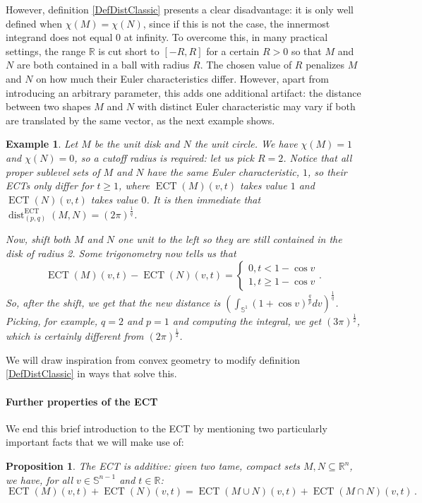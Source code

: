 \documentclass[a4paper]{article}
\newtheorem{prop}[theorem]{Proposition}
\newtheorem{example}[theorem]{Example}
\newcommand{\ECT}{\operatorname{ECT}}
\newcommand{\bb}{\mathbb}
\newcommand{\dist}[2]{\operatorname{dist}^{\operatorname{ECT}}_{(#1, #2)}}
\begin{document}
However, definition \ref{DefDistClassic} presents a clear disadvantage: it is only well defined when $\chi(M)=\chi(N)$, since if this is not the case, the innermost integrand does not equal $0$ at infinity. To overcome this, in many practical settings, the range $\mathbb R$ is cut short to $[-R,R]$ for a certain $R>0$ so that $M$ and $N$ are both contained in a ball with radius $R$. The chosen value of $R$ penalizes $M$ and $N$ on how much their Euler characteristics differ. However, apart from introducing an arbitrary parameter, this adds one additional artifact: the distance between two shapes $M$ and $N$ with distinct Euler characteristic may vary if both are translated by the same vector, as the next example shows.
\begin{example}
	Let $M$ be the unit disk and $N$ the unit circle. We have $\chi(M)=1$ and $\chi(N)=0$, so a cutoff radius is required: let us pick $R=2$. Notice that all proper sublevel sets of $M$ and $N$ have the same Euler characteristic, $1$, so their ECTs only differ for $t \geq 1$, where $\ECT(M)(v,t)$ takes value $1$ and $\ECT(N)(v,t)$ takes value $0$. It is then immediate that $\dist{p}{q}(M,N)=(2 \pi)^\frac{1}{q}$.
	
	Now, shift both $M$ and $N$ one unit to the left so they are still contained in the disk of radius 2. Some trigonometry now tells us that \[\ECT(M)(v,t)-\ECT(N)(v,t)=\begin{cases}
		0, t < 1-\cos v \\
		1, t \geq 1-\cos v
	\end{cases}.\] So, after the shift, we get that the new distance is $\left( \int_{\bb S^1} (1+\cos v)^\frac{q}{p} dv\right)^\frac{1}{q}$. Picking, for example, $q=2$ and $p=1$ and computing the integral, we get $(3\pi )^\frac{1}{2}$, which is certainly different from $(2\pi)^\frac{1}{2}$.
\end{example}
We will draw inspiration from convex geometry to modify definition \ref{DefDistClassic} in ways that solve this. 

\paragraph{Further properties of the ECT}
We end this brief introduction to the ECT by mentioning two particularly important facts that we will make use of:
\begin{prop}\label{add}
	The ECT is additive: given two tame, compact sets $M, N \subseteq \bb R^n$, we have, for all $v \in \bb S^{n-1}$ and $t \in \bb R$:
	\[
		\ECT(M)(v,t)+\ECT(N)(v,t)=\ECT(M \cup N)(v,t)+\ECT(M \cap N)(v,t)\, .
	\]
\end{prop}
\end{document}

